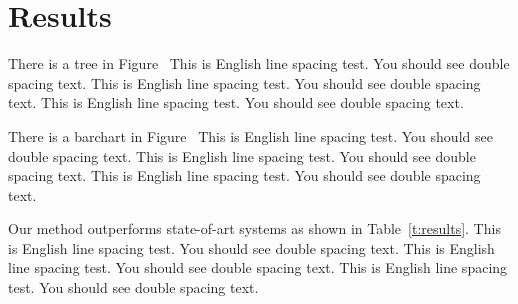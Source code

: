 \chapter{Results}
\label{c:result}

There is a tree in Figure~%
This is English line spacing test. You should see double spacing text.
This is English line spacing test. You should see double spacing text.
This is English line spacing test. You should see double spacing text.

%

There is a barchart in Figure~%
This is English line spacing test. You should see double spacing text.
This is English line spacing test. You should see double spacing text.
This is English line spacing test. You should see double spacing text.

%

Our method outperforms state-of-art systems as shown in Table~\ref{t:results}.
This is English line spacing test. You should see double spacing text.
This is English line spacing test. You should see double spacing text.
This is English line spacing test. You should see double spacing text.



